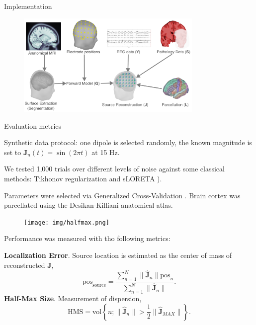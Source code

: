 \documentclass[final]{beamer}
\newlength{\colwidth}
\newcommand{\sset}[1]{ \left\{ #1 \right\} }
\newcommand{\ppar}[1]{ \left( #1 \right) }
\newcommand{\nnorm}[1]{\lVert #1 \rVert}
\newcommand{\J}{\mathbf{J}}
\begin{document}
\begin{frame}[t]
\begin{columns}[t]
\begin{column}{\colwidth}
\begin{block}{Implementation}
\begin{figure}
\centering
\includegraphics[width=0.8\textwidth]{figures/workflow}
\end{figure}
\end{block}

\begin{block}{Evaluation metrics}

Synthetic data protocol: one dipole is selected randomly, the known magnitude is set to {$\J_n(t)=\sin(2\pi t)$} at 15 Hz.

We tested 1,000 trials over different levels of noise against some classical methods: Tikhonov regularization and sLORETA \cite{survey2014}).

Parameters were selected via Generalized Cross-Validation \cite{siam_book}.
%
Brain cortex was parcellated using the Desikan-Killiani anatomical atlas.

\begin{figure}
  \begin{center}
    \texttt{[image: img/halfmax.png]}
  \end{center}
\end{figure}

Performance was measured with tho following metrics:

\textbf{Localization Error}. Source location is estimated as the center of mass of reconstructed $\J$,
$$
\text{pos}_{\text{source}} = \frac{\sum_{n=1}^N \nnorm{\hat{\J}_n} \text{pos}_n }{\sum_{n=1}^N \nnorm{\hat{\J}_n} }.
$$
\textbf{Half-Max Size}. Measurement of dispersion,
$$
\text{HMS} = \text{vol}\sset{n; {\nnorm{\hat{\J}_n} } > \frac{1}{2}\nnorm{\hat{\J}_{MAX}}  }.
$$


\end{block}
\end{column}
\end{columns}
\end{frame}
\end{document}
